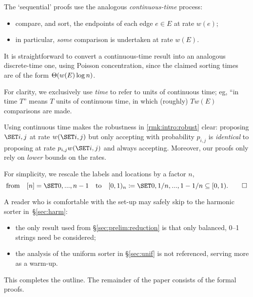 \documentclass{article}
\begin{document}
\begin{Proof}
\qedtriangle
The `sequential' proofs use the analogous \emph{continuous-time} process:
\begin{itemize}[noitemsep]
	\item 
	compare, and sort, the endpoints of each edge $e \in E$ at rate $w(e)$;
	\item 
	
	in particular, \emph{some} comparison is undertaken at rate $w(E)$.
\end{itemize}
It is straightforward to convert a continuous-time result into an analogous discrete-time one,
using Poisson concentration,
since the claimed sorting times are of the form $\Theta(  w(E) \log n  )$.

For clarity, we exclusively use \textit{time} to refer to units of continuous time; eg, ``in time $T$'' means $T$ units of continuous time, in which (roughly) $T w(E)$ comparisons are made.

Using continuous time makes the robustness in \cref{rmk:intro:robust} clear:
	proposing $\set{i,j}$ at rate $w(\set{i,j})$ but only accepting with probability $p_{i,j}$
is \emph{identical} to
	proposing at rate $p_{i,j} w(\set{i,j})$ and always accepting.
Moreover, our proofs only rely on \emph{lower} bounds on the rates.
\end{Proof}

\begin{Proof}
\qedtriangle
For simplicity, we rescale the labels and locations by a factor $n$,
\[
	\text{from}
\quad
	[n] = \set{0, ..., n-1}
\Quad{to}
	\coi{0,1}_n \cq \set{0, 1/n, ..., 1 - 1/n} \subseteq \coi{0,1}.
\qedhere
\]
\end{Proof}

A reader who is comfortable with the set-up may safely skip to the harmonic sorter in~\S\ref{sec:harm}:
\begin{itemize}[noitemsep]
	\item 
	the only result used from \S\ref{sec:prelim:reduction} is that only balanced, 0--1 strings need be considered;
	
	\item 
	the analysis of the uniform sorter in \S\ref{sec:unif} is not referenced, serving more as a warm-up.
\end{itemize}
This completes the outline.
The remainder of the paper consists of the formal proofs.
\end{document}
